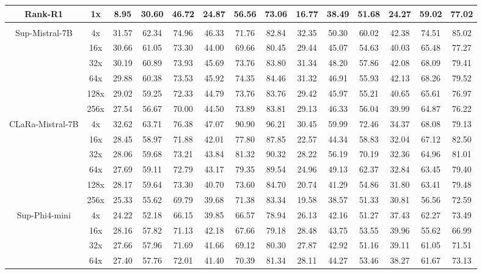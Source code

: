 \documentclass{applemlr}
\numberwithin{equation}{section}
\begin{document}
\begin{table}[!htbp]
\begin{tabular}{c|c|ccc|ccc|ccc|ccc}
Rank-R1&1x & 8.95 & 30.60 & 46.72 & 24.87 & 56.56 & 73.06 & 16.77 & 38.49 & 51.68 & 24.27 & 59.02 & 77.02 \\
\hline
\rowcolor{gray!15}
\multicolumn{14}{c}{\textbf{Pretraining-initialized}} \\
\multirow{6}{*}{Sup-Mistral-7B} & 4x & 31.57 & 62.34 & 74.96 & 46.33 & 71.76 & 82.84 & 32.35 & 50.30 & 60.02 & 42.38 & 74.51 & 85.02  \\
 & 16x & 30.66 & 61.05 & 73.30 & 44.00 & 69.66 & 80.45 & 29.44 & 45.07 & 54.63 & 40.03 & 65.48 & 77.27  \\
 & 32x & 30.19 & 60.89 & 73.93 & 45.69 & 73.76 & 83.80 & 31.34 & 48.20 & 57.86 & 42.08 & 68.09 & 79.41 \\
 & 64x & 29.88 & 60.38 & 73.53 & 45.92 & 74.35 & 84.46 & 31.32 & 46.91 & 55.93 & 42.13 & 68.26 & 79.52  \\
 & 128x & 29.02 & 59.25 & 72.33 & 44.79 & 73.76 & 83.76 & 29.42 & 45.97 & 55.21 & 40.65 & 65.61 & 76.97 \\
 & 256x & 27.54 & 56.67 & 70.00 & 44.50 & 73.89 & 83.81 & 29.13 & 46.33 & 56.04 & 39.99 & 64.87 & 76.22   \\
\cline{2-14}
\multirow{6}{*}{CLaRa-Mistral-7B} & 4x & 32.62 & 63.71 & 76.38 & 47.07 & 90.90 & 96.21 & 30.45 & 59.99 & 72.46 & 34.37 & 68.08 & 79.13 \\
& 16x & 28.45 & 58.97 & 71.88 & 42.01 & 77.80 & 87.85 & 22.57 & 44.34 & 58.83 & 32.04 & 67.12 & 82.50 \\
 & 32x & 28.06 & 59.68 & 73.21 & 43.84 & 81.32 & 90.32 & 28.22 & 56.19 & 70.19 & 32.36 & 64.96 & 81.01\\
 & 64x & 27.69 & 59.11 & 72.79 & 43.17 & 79.35 & 89.54 & 24.96 & 49.13 & 62.37 & 32.84 & 63.45 & 79.40  \\
 & 128x & 28.17 & 59.64 & 73.30 & 40.70 & 73.60 & 84.70 & 20.74 & 41.29 & 54.86 & 31.80 & 63.41 & 79.48  \\
 & 256x & 25.33 & 55.62 & 69.79 & 39.68 & 71.38 & 83.34 & 19.58 & 38.57 & 51.33 & 30.81 & 56.56 & 72.59  \\
 \cline{2-14}
\multirow{6}{*}{Sup-Phi4-mini} & 4x & 24.22 & 52.18 & 66.15 & 39.85 & 66.57 & 78.94 & 26.13 & 42.16 & 51.27 & 37.43 & 62.27 & 73.49  \\
 & 16x & 28.16 & 57.82 & 71.13 & 42.18 & 67.66 & 79.18 & 28.48 & 43.75 & 53.55 & 39.96 & 55.62 & 66.99  \\
 & 32x & 27.66 & 57.96 & 71.69 & 41.66 & 69.12 & 80.30 & 27.87 & 42.92 & 51.16 & 39.11 & 61.05 & 71.51  \\
 & 64x & 27.40 & 57.76 & 72.01 & 41.40 & 70.39 & 81.34 & 28.11 & 44.27 & 53.46 & 38.27 & 61.67 & 73.13   \\

\end{tabular}
\end{table}
\end{document}
